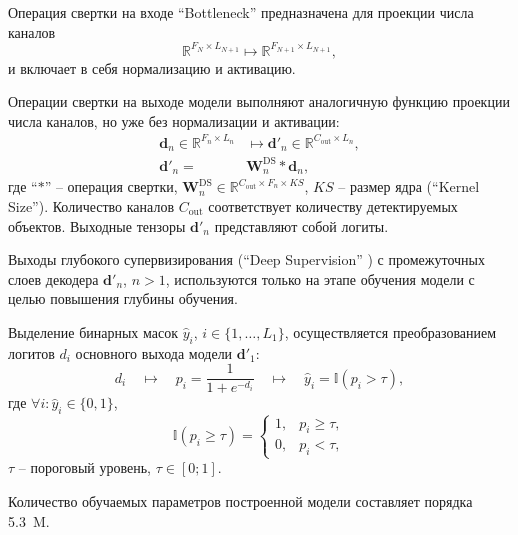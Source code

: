 Операция свертки на входе \enquote{Bottleneck} предназначена для проекции числа каналов
\begin{equation*}
    \mathbb{R}^{F_N \times L_{N+1}} \mapsto \mathbb{R}^{F_{N+1} \times L_{N+1}},
\end{equation*}
и включает в себя нормализацию и активацию.

Операции свертки на выходе модели выполняют аналогичную функцию проекции числа каналов, но уже без нормализации и активации:
\begin{equation*}
    \begin{aligned}
        \mathbf{d}_n \in \mathbb{R}^{F_n \times L_n} &\mapsto \mathbf{d}'_n \in \mathbb{R}^{C_\text{out} \times L_n}, \\
        \mathbf{d}'_n = & \mathbf{W}_n^\text{DS} \ast \mathbf{d}_n,
    \end{aligned}
\end{equation*}
где \enquote{${\ast}$} -- операция свертки, ${\mathbf{W}_n^\text{DS} \in \mathbb{R}^{C_\text{out} \times F_n \times KS}}$, ${KS}$ -- размер ядра (\enquote{Kernel Size}). Количество каналов ${C_\text{out}}$ соответствует количеству детектируемых объектов. Выходные тензоры ${\mathbf{d}'_n}$ представляют собой логиты.

Выходы глубокого супервизирования (\enquote{Deep Supervision} \cite{lee2015deeply}) с промежуточных слоев декодера ${\mathbf{d}'_n}$, ${n > 1}$, используются только на этапе обучения модели с целью повышения глубины обучения.

Выделение бинарных масок ${\hat{y}_i}$, ${i \in \{1, \dots, L_1\}}$, осуществляется преобразованием логитов ${d_i}$ основного выхода модели ${\mathbf{d}'_1}$:
\begin{equation}\label{eqn:logit2mask}
    d_i \quad \mapsto \quad p_i = \frac{1}{1 + e^{-d_i}} \quad \mapsto \quad \hat{y}_i = \mathbb{I}\!\left( p_i > \tau \right),
\end{equation}
где ${\forall i \colon \hat{y}_i \in \{0, 1\}}$,
\begin{equation*}
    \mathbb{I}(p_i \geq \tau) = 
        \begin{cases}
            1, & p_i \geq \tau, \\
            0, & p_i < \tau,
        \end{cases}
\end{equation*}
${\tau}$ -- пороговый уровень, ${\tau \in \left[0; 1 \right]}$.

Количество обучаемых параметров построенной модели составляет порядка \num{5.3}~M.

